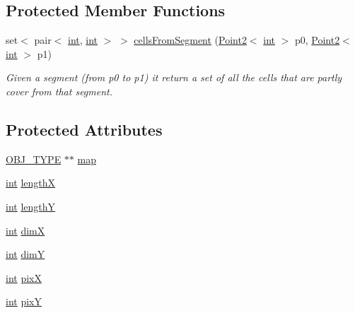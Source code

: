 \subsection*{Protected Member Functions}
\begin{DoxyCompactItemize}
\item 
set$<$ pair$<$ \mbox{\hyperlink{draw_8hh_aa620a13339ac3a1177c86edc549fda9b}{int}}, \mbox{\hyperlink{draw_8hh_aa620a13339ac3a1177c86edc549fda9b}{int}} $>$ $>$ \mbox{\hyperlink{class_mapp_a31c6c064aa9ca11bbf2dfc8f0dff6f2f}{cells\+From\+Segment}} (\mbox{\hyperlink{class_point2}{Point2}}$<$ \mbox{\hyperlink{draw_8hh_aa620a13339ac3a1177c86edc549fda9b}{int}} $>$ p0, \mbox{\hyperlink{class_point2}{Point2}}$<$ \mbox{\hyperlink{draw_8hh_aa620a13339ac3a1177c86edc549fda9b}{int}} $>$ p1)
\begin{DoxyCompactList}\small\item\em Given a segment (from p0 to p1) it return a set of all the cells that are partly cover from that segment. \end{DoxyCompactList}\end{DoxyCompactItemize}
\subsection*{Protected Attributes}
\begin{DoxyCompactItemize}
\item 
\mbox{\hyperlink{map_8hh_a714b9c2c276fbae637fee36453d9121e}{O\+B\+J\+\_\+\+T\+Y\+PE}} $\ast$$\ast$ \mbox{\hyperlink{class_mapp_a91181e95875bc82d03e832b9d901cb59}{map}}
\item 
\mbox{\hyperlink{draw_8hh_aa620a13339ac3a1177c86edc549fda9b}{int}} \mbox{\hyperlink{class_mapp_add62ddc7c9bf47dcf3dc8916dc58d41c}{lengthX}}
\item 
\mbox{\hyperlink{draw_8hh_aa620a13339ac3a1177c86edc549fda9b}{int}} \mbox{\hyperlink{class_mapp_ad108cf6f9d0fa2f7b24405938dd7f74c}{lengthY}}
\item 
\mbox{\hyperlink{draw_8hh_aa620a13339ac3a1177c86edc549fda9b}{int}} \mbox{\hyperlink{class_mapp_aeb3ba1ee2b2ac64b01a459b85610f524}{dimX}}
\item 
\mbox{\hyperlink{draw_8hh_aa620a13339ac3a1177c86edc549fda9b}{int}} \mbox{\hyperlink{class_mapp_a7d830edb47e7a9b8d2574e53150a906c}{dimY}}
\item 
\mbox{\hyperlink{draw_8hh_aa620a13339ac3a1177c86edc549fda9b}{int}} \mbox{\hyperlink{class_mapp_a0d751ee7f6aacc352c1ffb1bf95c21af}{pixX}}
\item 
\mbox{\hyperlink{draw_8hh_aa620a13339ac3a1177c86edc549fda9b}{int}} \mbox{\hyperlink{class_mapp_a756d60b3d694342b7c75621c8559c00e}{pixY}}
\end{DoxyCompactItemize}


